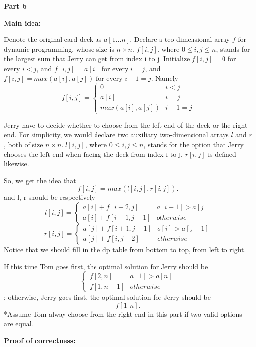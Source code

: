 \documentclass{article}
\begin{document}
\pagebreak

\textbf{Part b}

\textbf{Main idea:}

Denote the original card deck as $a[1\dots n]$. Declare a teo-dimensional array $f$ for dynamic programming, whose size is $n\times n$. $f[i,j]$, where $0\leq i,j\leq n$, stands for the largest sum that Jerry can get from index i to j.
Initialize $f[i,j]=0$ for every $i<j$, and $f[i,j]=a[i]$ for every $i=j$, and $f[i,j]=max(a[i],a[j])$ for every $i+1=j$.
Namely $$f[i,j]=\begin{cases}
		0              & i<j   \\
		a[i]           & i=j   \\
		max(a[i],a[j]) & i+1=j
	\end{cases}$$

Jerry have to decide whether to choose from the left end of the deck or the right end. For simplicity, we would declare two  auxiliary two-dimensional arrays $l$ and $r$, both of size $n\times n$. $l[i,j]$, where $0\leq i,j\leq n$, stands for the option that Jerry chooses the left end when facing the deck from index i to j. $r[i,j]$ is defined likewise.

So, we get the idea that $$f[i,j]=max(l[i,j],r[i,j]).$$
and l, r should be respectively: $$l[i,j]=\begin{cases}
		a[i]+f[i+2,j]   & a[i+1]>a[j] \\
		a[i]+f[i+1,j-1] & otherwise
	\end{cases}$$
$$r[i,j]=\begin{cases}
		a[j]+f[i+1,j-1] & a[i]>a[j-1] \\
		a[j]+f[i,j-2]   & otherwise
	\end{cases}$$
Notice that we should fill in the dp table from bottom to top, from left to right.

If this time Tom goes first, the optimal solution for Jerry should be $$\begin{cases}
		f[2,n]   & a[1]>a[n] \\
		f[1,n-1] & otherwise
	\end{cases}$$
; otherwise, Jerry goes first, the optimal solution for Jerry should be $$f[1,n].$$
*Assume Tom alway choose from the right end in this part if two valid options are equal.

\textbf{Proof of correctness:}
\end{document}
